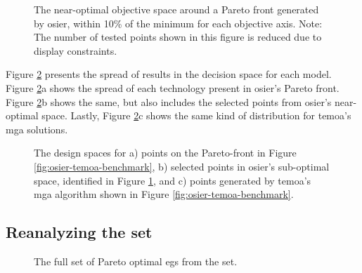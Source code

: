 \begin{figure}[ht!]
    \begin{center}
        \resizebox{\columnwidth}{!}{}
        \caption{The near-optimal objective space around a Pareto front generated by
        \gls{osier}, within 10\% of the minimum for each objective axis. Note:
        The number of tested points shown in this figure is reduced due to
        display constraints.}
        \label{fig:osier-near-optimal}
    \end{center}
\end{figure}

Figure \ref{fig:temoa-benchmark-03} presents the spread of results in
the decision space for each model. Figure \ref{fig:temoa-benchmark-03}a shows
the spread of each technology present in \gls{osier}'s Pareto front. Figure
\ref{fig:temoa-benchmark-03}b shows the same, but also includes the
selected points from \gls{osier}'s near-optimal space. Lastly, Figure
\ref{fig:temoa-benchmark-03}c shows the same kind of distribution for
\gls{temoa}'s \gls{mga} solutions.

\begin{figure}[ht!]
  \centering
  \resizebox{\columnwidth}{!}{}
  \caption{The design spaces for a) points on the Pareto-front in Figure
  \ref{fig:osier-temoa-benchmark}, b) selected points in \gls{osier}'s sub-optimal
  space, identified in Figure \ref{fig:osier-near-optimal}, and c) points
  generated by \gls{temoa}'s \gls{mga} algorithm shown in Figure
  \ref{fig:osier-temoa-benchmark}.}
  \label{fig:temoa-benchmark-03}
\end{figure}

\subsection{Reanalyzing the \gls{set}}

\begin{figure}[ht!]
    \begin{center}
        \resizebox{\columnwidth}{!}{}
        \caption{The full set of Pareto optimal \glspl{eg} from 
        the \gls{set}.}
        \label{fig:full-set-plot}
    \end{center}
\end{figure}

\begin{figure}[ht!]
    \begin{center}
        \resizebox{\columnwidth}{!}{}
        \caption{}
        \label{fig:non-optimal}
    \end{center}
\end{figure}


